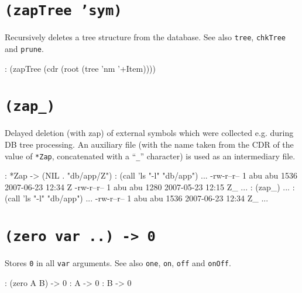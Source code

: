  
\section*{\texttt{(zapTree 'sym)}}
\label{sec:func-ref-Z-(zapTree 'sym)}


Recursively deletes a tree structure from the database. See also \texttt{tree},
\texttt{chkTree} and \texttt{prune}.


\begin{wideverbatim}
: (zapTree (cdr (root (tree 'nm '+Item))))
\end{wideverbatim}

 
\section*{\texttt{(zap\_)}}
\label{sec:func-ref-Z-(zap)} 

Delayed deletion (with zap) of external symbols which were collected
e.g. during DB tree processing. An auxiliary file (with the name taken
from the CDR of the value of \texttt{*Zap}, concatenated with a
``\texttt{\_}'' character) is used as an intermediary file.


\begin{wideverbatim}
: *Zap
-> (NIL . "db/app/Z")
: (call 'ls "-l" "db/app")
...
-rw-r--r-- 1 abu abu     1536 2007-06-23 12:34 Z
-rw-r--r-- 1 abu abu     1280 2007-05-23 12:15 Z_
...
: (zap_)
...
: (call 'ls "-l" "db/app")
...
-rw-r--r-- 1 abu abu     1536 2007-06-23 12:34 Z_
...
\end{wideverbatim}

              
\section*{\texttt{(zero var ..) -> 0} }
\label{sec:(zero var ..) -> 0}

Stores \texttt{0} in all \texttt{var} arguments. See also \texttt{one}, \texttt{on}, \texttt{off} and
\texttt{onOff}.


\begin{wideverbatim}
: (zero A B)
-> 0
: A
-> 0
: B
-> 0
\end{wideverbatim}


